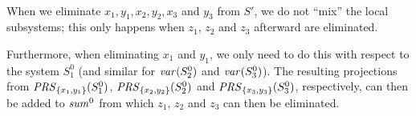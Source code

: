 \begin{example}
\begin{gather*}
\end{gather*}
When we eliminate $x_1, y_1, x_2, y_2, x_3$ and $y_3$ from $S'$, we do not ``mix'' the local subsystems; this only happens when $z_1$, $z_2$ and $z_3$ 
 afterward are eliminated. 

Furthermore, when eliminating $x_1$ and $y_1$, we only need to do this with respect to the system $S^0_1$ (and similar for $\mathit{var}(S^0_2)$ and $\mathit{var}(S^0_3)$). The resulting projections from $\mathit{PRS}_{\{x_1, y_1\}}(S^0_1)$, $\mathit{PRS}_{\{x_2, y_2\}}(S^0_2)$ and $\mathit{PRS}_{\{x_3, y_3\}}(S^0_3)$, respectively, can then be added to $\mathit{sum}^0$ %
from which $z_1$, $z_2$ and $z_3$ 
can then be eliminated. %
\end{example}

